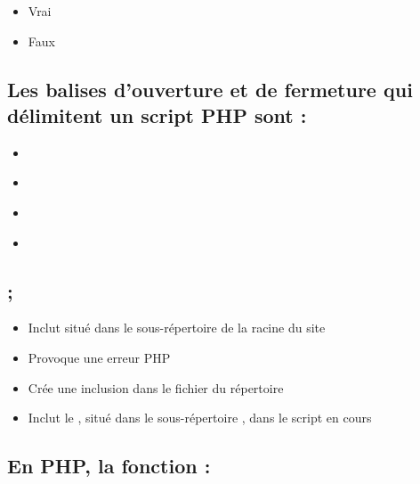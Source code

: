 \documentclass[11pt,a4paper]{article}
\begin{document}
\begin{itemize}
\item[\CaseCoche] Vrai \\
\item[\CaseCoche] Faux \\
\end{itemize}


\subsection{Les balises d'ouverture et de fermeture qui délimitent un script PHP sont :}

\begin{itemize}
\item[\CaseCoche]  \\
\item[\CaseCoche]  \\
\item[\CaseCoche]  \\
\item[\CaseCoche]  \\
\end{itemize}


\subsection{;}

\begin{itemize}
\item[\CaseCoche] Inclut  situé dans le sous-répertoire  de la racine du site \\
\item[\CaseCoche] Provoque une erreur PHP \\
\item[\CaseCoche] Crée une inclusion dans le fichier  du répertoire  \\
\item[\CaseCoche] Inclut le , situé dans le sous-répertoire , dans le script en cours \\
\end{itemize}


\subsection{En PHP, la fonction  :}
\end{document}
